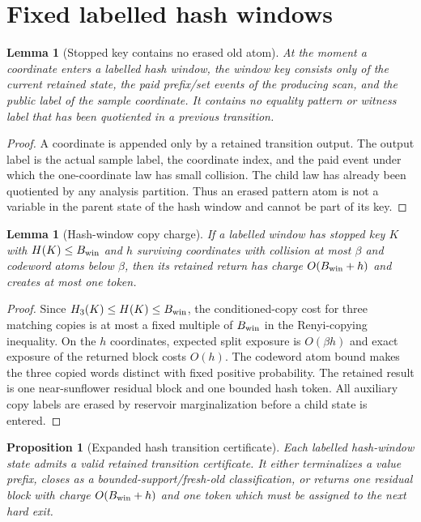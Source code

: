 \documentclass[11pt]{article}
\newtheorem{lemma}[theorem]{Lemma}
\newtheorem{proposition}[theorem]{Proposition}
\theoremstyle{remark}
\begin{document}
\section{Fixed labelled hash windows}\label{app:hash}

\begin{lemma}[Stopped key contains no erased old atom]\label{lem:app-hash-key-clean}
At the moment a coordinate enters a labelled hash window, the window key consists only of the current retained state, the paid prefix/set events of the producing scan, and the public label of the sample coordinate.  It contains no equality pattern or witness label that has been quotiented in a previous transition.
\end{lemma}

\begin{proof}
A coordinate is appended only by a retained transition output.  The output label is the actual sample label, the coordinate index, and the paid event under which the one-coordinate law has small collision.  The child law has already been quotiented by any analysis partition.  Thus an erased pattern atom is not a variable in the parent state of the hash window and cannot be part of its key.
\end{proof}

\begin{lemma}[Hash-window copy charge]\label{lem:app-hash-copy-charge}
If a labelled window has stopped key $K$ with $H(K)\le B_{\rm win}$ and $h$ surviving coordinates with collision at most $\beta$ and codeword atoms below $\beta$, then its retained return has charge $O(B_{\rm win}+h)$ and creates at most one token.
\end{lemma}

\begin{proof}
Since $H_3(K)\le H(K)\le B_{\rm win}$, the conditioned-copy cost for three matching copies is at most a fixed multiple of $B_{\rm win}$ in the Renyi-copying inequality.  On the $h$ coordinates, expected split exposure is $O(\beta h)$ and exact exposure of the returned block costs $O(h)$.  The codeword atom bound makes the three copied words distinct with fixed positive probability.  The retained result is one near-sunflower residual block and one bounded hash token.  All auxiliary copy labels are erased by reservoir marginalization before a child state is entered.
\end{proof}

\begin{proposition}[Expanded hash transition certificate]\label{prop:app-hash-certificate}
Each labelled hash-window state admits a valid retained transition certificate.  It either terminalizes a value prefix, closes as a bounded-support/fresh-old classification, or returns one residual block with charge $O(B_{\rm win}+h)$ and one token which must be assigned to the next hard exit.
\end{proposition}
\end{document}
